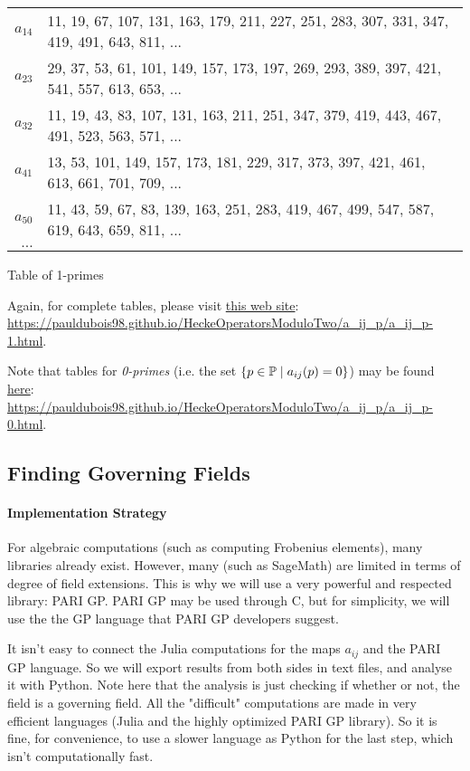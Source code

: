 \begin{center}
\begin{tabular}{|r|l|}
		$ a_{1 4} $ & 11, 19, 67, 107, 131, 163, 179, 211, 227, 251, 283, 307, 331, 347, 419, 491, 643, 811, ...\\
		$ a_{2 3} $ & 29, 37, 53, 61, 101, 149, 157, 173, 197, 269, 293, 389, 397, 421, 541, 557, 613, 653, ...\\       
		$ a_{3 2} $ & 11, 19, 43, 83, 107, 131, 163, 211, 251, 347, 379, 419, 443, 467, 491, 523, 563, 571, ...\\
		$ a_{4 1} $ & 13, 53, 101, 149, 157, 173, 181, 229, 317, 373, 397, 421, 461, 613, 661, 701, 709, ...\\
		$ a_{5 0} $ & 11, 43, 59, 67, 83, 139, 163, 251, 283, 419, 467, 499, 547, 587, 619, 643, 659, 811, ...\\
		$ \dots $ & \\
		\hline
	\end{tabular}

	Table of 1-primes
\end{center}
Again, for complete tables, please visit \href{https://pauldubois98.github.io/HeckeOperatorsModuloTwo/a_ij_p/a_ij_p-1.html}{this web site}:\\ \url{https://pauldubois98.github.io/HeckeOperatorsModuloTwo/a_ij_p/a_ij_p-1.html}.

Note that tables for \textit{0-primes} (i.e. the set $\{ p \in \mathbb{P} \mid a_{ij}(p) = 0 \}$) may be found \href{https://pauldubois98.github.io/HeckeOperatorsModuloTwo/a_ij_p/a_ij_p-0.html}{here}:\\
\url{https://pauldubois98.github.io/HeckeOperatorsModuloTwo/a_ij_p/a_ij_p-0.html}.




\subsection{Finding Governing Fields}
\paragraph{Implementation Strategy}
For algebraic computations (such as computing Frobenius elements), many libraries already exist.
However, many (such as SageMath) are limited in terms of degree of field extensions.
This is why we will use a very powerful and respected library: PARI GP.
PARI GP may be used through C, but for simplicity, we will use the the GP language that PARI GP developers suggest.

It isn't easy to connect the Julia computations for the maps $a_{ij}$ and the PARI GP language.
So we will export results from both sides in text files, and analyse it with Python.
Note here that the analysis is just checking if whether or not, the field is a governing field.
All the "difficult" computations are made in very efficient languages (Julia and the highly optimized PARI GP library).
So it is fine, for convenience, to use a slower language as Python for the last step, which isn't computationally fast.


